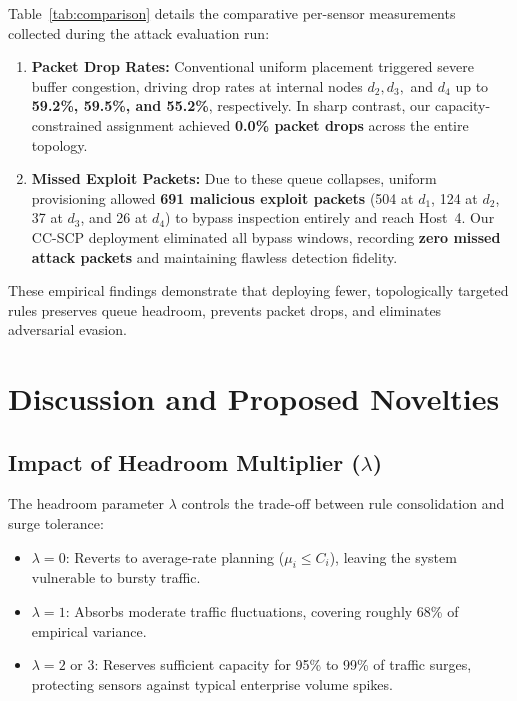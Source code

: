 \documentclass[conference]{IEEEtran}
\begin{document}
Table~\ref{tab:comparison} details the comparative per-sensor measurements collected during the attack evaluation run:
\begin{enumerate}
    \item \textbf{Packet Drop Rates:} Conventional uniform placement triggered severe buffer congestion, driving drop rates at internal nodes $d_2, d_3,$ and $d_4$ up to \textbf{59.2\%, 59.5\%, and 55.2\%}, respectively. In sharp contrast, our capacity-constrained assignment achieved \textbf{0.0\% packet drops} across the entire topology.
    \item \textbf{Missed Exploit Packets:} Due to these queue collapses, uniform provisioning allowed \textbf{691 malicious exploit packets} (504 at $d_1$, 124 at $d_2$, 37 at $d_3$, and 26 at $d_4$) to bypass inspection entirely and reach Host~4. Our CC-SCP deployment eliminated all bypass windows, recording \textbf{zero missed attack packets} and maintaining flawless detection fidelity.
\end{enumerate}

These empirical findings demonstrate that deploying fewer, topologically targeted rules preserves queue headroom, prevents packet drops, and eliminates adversarial evasion.

\section{Discussion and Proposed Novelties}
\label{sec:novelty}

\subsection{Impact of Headroom Multiplier ($\lambda$)}
The headroom parameter $\lambda$ controls the trade-off between rule consolidation and surge tolerance:
\begin{itemize}
    \item $\lambda = 0$: Reverts to average-rate planning ($\mu_i \le C_i$), leaving the system vulnerable to bursty traffic.
    \item $\lambda = 1$: Absorbs moderate traffic fluctuations, covering roughly 68\% of empirical variance.
    \item $\lambda = 2$ or $3$: Reserves sufficient capacity for 95\% to 99\% of traffic surges, protecting sensors against typical enterprise volume spikes.
\end{itemize}
\end{document}
